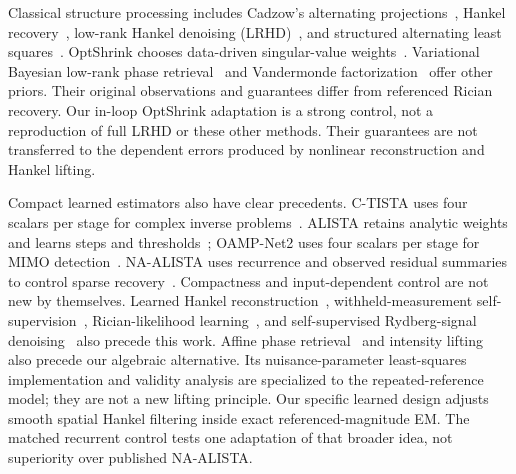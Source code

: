\documentclass[10pt,journal,letterpaper]{IEEEtran}
\begin{document}
Classical structure processing includes Cadzow's alternating projections~\cite{cadzow1988}, Hankel recovery~\cite{chen2014emac}, low-rank Hankel denoising (LRHD)~\cite{yin2021}, and structured alternating least squares~\cite{zachariah2012}. OptShrink chooses data-driven singular-value weights~\cite{nadakuditi2014}. Variational Bayesian low-rank phase retrieval~\cite{liu2018lrpr} and Vandermonde factorization~\cite{ying2018hvaf} offer other priors. Their original observations and guarantees differ from referenced Rician recovery. Our in-loop OptShrink adaptation is a strong control, not a reproduction of full LRHD or these other methods. Their guarantees are not transferred to the dependent errors produced by nonlinear reconstruction and Hankel lifting.

Compact learned estimators also have clear precedents. C-TISTA uses four scalars per stage for complex inverse problems~\cite{takabe2020ctista}. ALISTA retains analytic weights and learns steps and thresholds~\cite{liu2019alista}; OAMP-Net2 uses four scalars per stage for MIMO detection~\cite{he2020oamp}. NA-ALISTA uses recurrence and observed residual summaries to control sparse recovery~\cite{behrens2021naalista}. Compactness and input-dependent control are not new by themselves. Learned Hankel reconstruction~\cite{huang2021}, withheld-measurement self-supervision~\cite{yaman2020,luo2023}, Rician-likelihood learning~\cite{parker2023}, and self-supervised Rydberg-signal denoising~\cite{liu2026} also precede this work. Affine phase retrieval~\cite{gao2018} and intensity lifting~\cite{candes2013phaselift,li2020affinelift} also precede our algebraic alternative. Its nuisance-parameter least-squares implementation and validity analysis are specialized to the repeated-reference model; they are not a new lifting principle. Our specific learned design adjusts smooth spatial Hankel filtering inside exact referenced-magnitude EM. The matched recurrent control tests one adaptation of that broader idea, not superiority over published NA-ALISTA.
\end{document}
